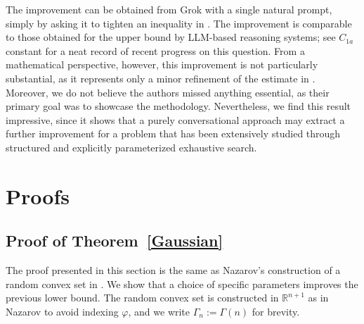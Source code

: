 \documentclass[11pt]{article}
\newtheorem{remark}[theorem]{Remark}
\begin{document}
The improvement can be obtained from Grok with a single natural prompt, simply by asking it to tighten an inequality in \cite{CloningerSteinerberger17}. The improvement is comparable to those obtained for the upper bound by LLM-based reasoning systems; see $C_{1a}$ constant \cite{OptConstC1a} for a neat record of recent progress on this question. From a mathematical perspective, however, this improvement is not particularly substantial, as it represents only a minor refinement of the estimate in \cite{CloningerSteinerberger17}. Moreover, we do not believe the authors missed anything essential, as their primary goal was to showcase the methodology. Nevertheless, we find this result impressive, since it shows that a purely conversational approach may extract a further improvement for a problem that has been extensively studied through structured and explicitly parameterized exhaustive search. 







\section{Proofs}\label{proofs}



\subsection{Proof of Theorem~\ref{Gaussian}}
The proof presented in this section is the same as Nazarov's construction of a random convex set in \cite{Nazarov2003}. We show that a choice of specific parameters improves the previous lower bound. The random convex set is constructed in $\mathbb{R}^{n+1}$ as in Nazarov \cite{Nazarov2003} to avoid indexing $\varphi$, and we write $\Gamma_n:=\Gamma(n)$ for brevity.
\medskip
\end{document}
